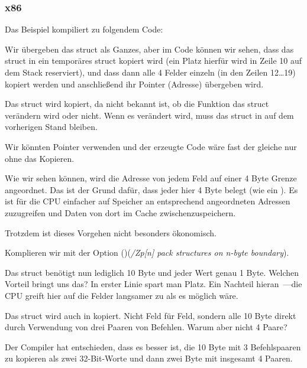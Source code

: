\subsubsection{x86}

Das Beispiel kompiliert zu folgendem Code:


Wir übergeben das struct als Ganzes, aber im Code können wir sehen, dass das struct in ein temporäres struct kopiert
wird (ein Platz hierfür wird in Zeile 10 auf dem Stack reserviert), und dass dann alle 4 Felder einzeln (in den Zeilen
12\ldots 19) kopiert werden und anschließend ihr Pointer (Adresse) übergeben wird.

Das struct wird kopiert, da nicht bekannt ist, ob die Funktion \ttf{} das struct verändern wird oder nicht.
Wenn es verändert wird, muss das struct in \main auf dem vorherigen Stand bleiben.

Wir könnten \CCpp Pointer verwenden und der erzeugte Code wäre fast der gleiche nur ohne das Kopieren.

Wie wir sehen können, wird die Adresse von jedem Feld auf einer 4 Byte Grenze angeordnet. Das ist der Grund dafür, dass
jeder \Tchar hier 4 Byte belegt (wie ein \Tint). Es ist für die CPU einfacher auf Speicher an entsprechend angeordneten
Adressen zuzugreifen und Daten von dort im Cache zwischenzuspeichern.

Trotzdem ist dieses Vorgehen nicht besonders ökonomisch.

Komplieren wir mit der Option ()(\emph{/Zp[n] pack structures on n-byte boundary}).


Das struct benötigt nun lediglich 10 Byte und jeder \Tchar Wert genau 1 Byte. Welchen Vorteil bringt uns das? 
In erster Linie spart man Platz. Ein Nachteil hieran~---die CPU greift hier auf die Felder langsamer zu als es möglich
wäre.

\label{short_struct_copying_using_MOV}
Das struct wird auch in \main kopiert. Nicht Feld für Feld, sondern alle 10 Byte direkt durch Verwendung von drei Paaren
von \MOV Befehlen. Warum aber nicht 4 Paare?

Der Compiler hat entschieden, dass es besser ist, die 10 Byte mit 3 \MOV Befehlspaaren zu kopieren als zwei 32-Bit-Worte
und dann zwei Byte mit insgesamt 4 \MOV Paaren.


